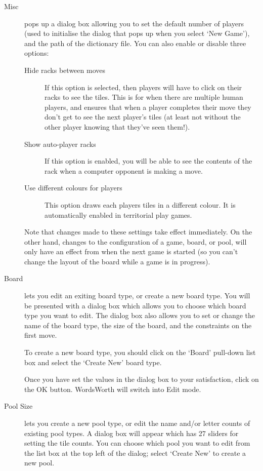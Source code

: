 \begin{description}
\item [Misc] pops up a dialog box allowing
you to set the default number of players (used to initialise
the dialog that pops up when you select `New Game'), and the path
of the dictionary file. You can also enable or disable three options:

\begin{description}
\item [Hide racks between moves] If this option is selected, then
players will have to click on their racks to see the tiles. This is
for when there are multiple human players, and ensures that when a
player completes their move they don't get to see the next player's
tiles (at least not without the other player knowing that they've
seen them!).
\item [Show auto-player racks] If this option is enabled, you will be
able to see the contents of the rack when a computer opponent is
making a move.
\item [Use different colours for players] This option draws each
players tiles in a different colour. It is automatically enabled in
territorial play games.
\end{description}

Note that changes made to these settings take effect immediately.
On the other hand, changes to the configuration of a game, board, or
pool, will only have an effect from when the next game is started
(so you can't change the layout of the board while a game is in
progress).

\item [Board] lets you edit an exiting board type, or
create a new board type. You will be presented with a dialog box
which allows you to choose which board type you want to edit. 
The dialog box also allows you to set or change the name of the
board type, the size of the board, and the constraints on the first 
move. 

To create a new board type, you should click on the `Board' pull-down
list box and select the `Create New' board type.

Once you have set the values in the dialog box to your satisfaction,
click on the OK button. WordsWorth will switch into Edit mode.

\item [Pool Size] lets you create a new pool type, or edit
the name and/or letter counts of existing pool types. A dialog box will
appear which has 27 sliders for setting the tile counts. 
You can choose which pool you want to edit from the list box at the
top left of the dialog; select `Create New' to create a new pool.


\end{description}
